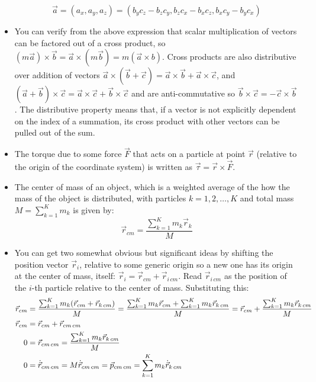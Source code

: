 \documentclass[10pt]{article}
\begin{document}
\begin{itemize}
    \begin{equation} \label{cross}
        \vec{a}=(a_x,a_y,a_z) = (b_yc_z - b_zc_y, b_zc_x - b_xc_z, 
        b_xc_y-b_yc_x)
    \end{equation}
    \item You can verify from the above expression that scalar multiplication
    of vectors can be factored out of a cross product, so
    $(m\vec{a})\times\vec{b} = \vec{a}\times(m\vec{b}) = m(\vec{a}\times{b})$.
    Cross products are also distributive over addition of vectors
    $\vec{a}\times(\vec{b}+\vec{c})=\vec{a}\times\vec{b}+\vec{a}\times\vec{c}$, 
    and 
    $(\vec{a}+\vec{b})\times\vec{c}=\vec{a}\times\vec{c}+\vec{b}\times\vec{c}$
    and are anti-commutative so
    $\vec{b}\times\vec{c} = - \vec{c}\times\vec{b}$. The distributive
    property means that, 
    if a vector is not explicitly dependent on the index of a summation, 
    its cross product with other vectors can be pulled out of the sum.
    \item The torque due to some force $\vec{F}$ that acts on a particle 
    at point $\vec{r}$ (relative to the origin of the coordinate system)
    is written as $\vec{\tau}=\vec{r}\times\vec{F}$.
    \item The center of mass of an object, 
    which is a weighted average of the how the mass of the object is 
    distributed, with particles $k=1,2,\ldots,K$ and total mass
    $M=\sum_{k=1}^K m_k$ is given by:
    \begin{equation} \label{rcm}
        \vec{r}_{cm} = \frac{\sum_{k=1}^K m_k\vec{r}_k}{M}
    \end{equation}
    \item You can get two somewhat obvious but significant ideas by shifting
    the position vector $\vec{r}_i$, relative to some generic origin 
    so a new one has its origin at 
    the center of mass, itself: $\vec{r}_i = \vec{r}_{cm}+\vec{r}_{i\,cm}$. 
    Read $\vec{r}_{i\,cm}$ as the position of the 
    $i$-th particle relative to the center of mass. Substituting this:
    \begin{align}
        \vec{r}_{cm} &= \frac{\sum_{k=1}^K m_k(\vec{r}_{cm}+\vec{r}_{k\,cm})}{M}
            = \frac{\sum_{k=1}^K m_k\vec{r}_{cm}
            + \sum_{k=1}^K m_k\vec{r}_{k\,cm}}{M} = 
            \vec{r}_{cm} + \frac{\sum_{k=1}^K m_k\vec{r}_{k\,cm}}{M} \notag \\
        \vec{r}_{cm} &= \vec{r}_{cm} + \vec{r}_{cm\,cm} \notag \\
        0 & = \vec{r}_{cm\, cm} = \frac{\sum_{k=1}^K m_k\vec{r}_{k\,cm}}{M} 
            \label{rcmcm}\\
        0 & = \dot{\vec{r}}_{cm\,cm} = M\dot{\vec{r}}_{cm\,cm} = 
            \vec{p}_{cm\,cm} = \sum_{k=1}^K m_k\dot{\vec{r}}_{k\,cm}
            \label{pcmcm}
    \end{align}


\end{itemize}
\end{document}
